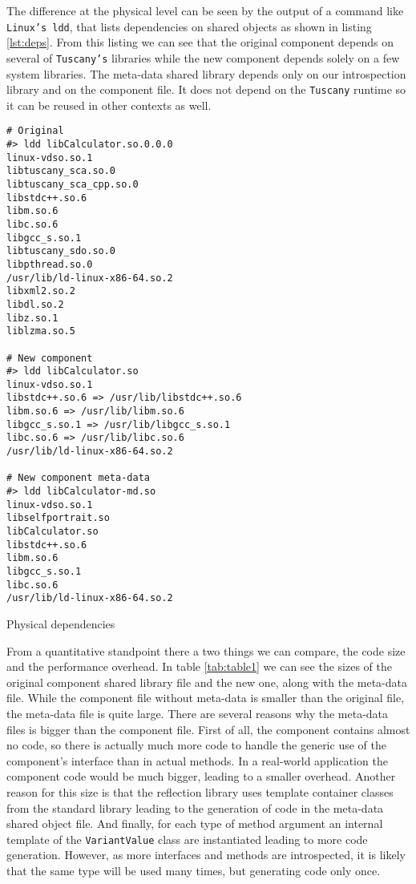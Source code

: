 The difference at the physical level can be seen by the output of a command like \texttt{Linux's ldd}, that lists
dependencies on shared objects as shown in listing \ref{lst:deps}. From this listing we can see that the original
component depends on several of \texttt{Tuscany's} libraries while the new component depends solely on a few system
libraries. The meta-data shared library depends only on our introspection library and on the component file. It does
not depend on the \texttt{Tuscany} runtime so it can be reused in other contexts as well.


\begin{listing}
\begin{verbatim}
# Original
#> ldd libCalculator.so.0.0.0 
linux-vdso.so.1
libtuscany_sca.so.0
libtuscany_sca_cpp.so.0
libstdc++.so.6
libm.so.6
libc.so.6
libgcc_s.so.1
libtuscany_sdo.so.0
libpthread.so.0
/usr/lib/ld-linux-x86-64.so.2
libxml2.so.2
libdl.so.2
libz.so.1
liblzma.so.5

# New component
#> ldd libCalculator.so 
linux-vdso.so.1
libstdc++.so.6 => /usr/lib/libstdc++.so.6
libm.so.6 => /usr/lib/libm.so.6
libgcc_s.so.1 => /usr/lib/libgcc_s.so.1
libc.so.6 => /usr/lib/libc.so.6
/usr/lib/ld-linux-x86-64.so.2

# New component meta-data
#> ldd libCalculator-md.so 
linux-vdso.so.1
libselfportrait.so
libCalculator.so
libstdc++.so.6
libm.so.6
libgcc_s.so.1
libc.so.6
/usr/lib/ld-linux-x86-64.so.2
 \end{verbatim}
\caption{Physical dependencies}
\label{lst:deps}
\end{listing}

From a quantitative standpoint there a two things we can compare, the code size and the performance overhead.
In table \ref{tab:table1} we can see the sizes of the original component shared library file and the new one,
along with the meta-data file. While the component file without meta-data is smaller than the original file,
the meta-data file is quite large. There are several reasons why the meta-data files is bigger than the component
file. First of all, the component contains almost no code, so there is actually much more code to handle the
generic use of the component's interface than in actual methods. In a real-world application the component code
would be much bigger, leading to a smaller overhead. Another reason for this size is that the reflection library
uses template container classes from the standard library leading to the generation of code in the meta-data shared
object file. And finally, for each type of method argument an internal template of the \texttt{VariantValue} class
are instantiated leading to more code generation. However, as more interfaces and methods are introspected, it is
likely that the same type will be used many times, but generating code only once.

